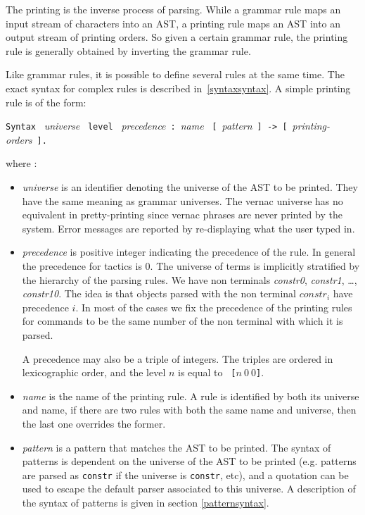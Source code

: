 {The printing is the inverse process of parsing. While a grammar rule
maps an input stream of characters
into an AST, a printing
rule maps an AST into an output stream of printing orders. 
So given a certain grammar rule, the printing rule 
is generally obtained by inverting the grammar rule.

Like grammar rules, it is possible to define several rules at the same
time. The exact syntax for complex rules is described
in~\ref{syntaxsyntax}. A simple printing rule is of the form:

\begin{center}
\verb+Syntax+ ~{\sl universe}
~\verb+level+ ~{\sl precedence}~\verb+:+~{\sl name}
~\verb+[+~{\sl pattern}~\verb+] -> [+~{\sl printing-orders}~\verb+].+
\end{center}

where :
\begin{itemize}
\item {\it universe} is an identifier denoting the universe of the AST to
  be printed. They have the same meaning as grammar universes.
  The vernac universe has no equivalent in pretty-printing since
  vernac phrases are never printed by the system. Error messages are
  reported by re-displaying what the user typed in.

\item {\it precedence} is positive integer indicating the precedence
  of the rule. In general the precedence for tactics is 0. The
  universe of terms is implicitly stratified by the hierarchy of
  the parsing rules. We have non terminals \textit{constr0},
  \textit{constr1}, \ldots, \textit{constr10}. 
  The idea is that objects parsed with the non terminal
  $constr_i$ have precedence $i$. In most of the cases we fix the
  precedence of the printing rules for commands to be the same number
  of the non terminal with which it is parsed.

  A precedence may also be a triple of integers. The triples are
  ordered in lexicographic order, and the level $n$ is equal to {\tt
  [$n~0~0$]}.

\item {\it name} is the name of the
  printing rule. A rule is identified by both its universe and name,
  if there are two rules with both the same name and universe, then
  the last one overrides the former.

\item {\it pattern} is a pattern that matches the AST to be
  printed. 
The syntax of patterns is dependent on the universe of the AST to be
printed (e.g. patterns are parsed as {\tt constr} if the universe is
{\tt constr}, etc), and a quotation can be used to escape the default
parser associated to this universe.
A description of the syntax of patterns is given in section
  \ref{patternsyntax}.


\end{itemize}}
